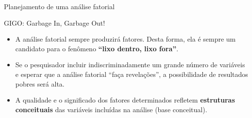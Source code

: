 \documentclass[
  ignorenonframetext,
  aspectratio=169,
]{beamer}
\providecommand{\tightlist}{%
  \setlength{\itemsep}{0pt}\setlength{\parskip}{0pt}}
\begin{document}
\begin{frame}{Planejamento de uma análise fatorial}
\label{planejamento-de-uma-anuxe1lise-fatorial-1}
\begin{block}{GIGO: Garbage In, Garbage Out!}
\label{gigo-garbage-in-garbage-out}
\begin{tcolorbox}[enhanced jigsaw, opacityback=0, left=2mm, colbacktitle=quarto-callout-warning-color!10!white, rightrule=.15mm, leftrule=.75mm, coltitle=black, toptitle=1mm, titlerule=0mm, toprule=.15mm, breakable, title=\textcolor{quarto-callout-warning-color}{\faExclamationTriangle}\hspace{0.5em}{Cuidado!}, colback=white, arc=.35mm, opacitybacktitle=0.6, bottomtitle=1mm, colframe=quarto-callout-warning-color-frame, bottomrule=.15mm]

\begin{itemize}
\tightlist
\item
  A análise fatorial sempre produzirá fatores. Desta forma, ela é sempre
  um candidato para o fenômeno \textbf{``lixo dentro, lixo fora''}.
\end{itemize}

\medskip

\begin{itemize}
\tightlist
\item
  Se o pesquisador incluir indiscriminadamente um grande número de
  variáveis e esperar que a análise fatorial ``faça revelações'', a
  possibilidade de resultados pobres será alta.
\end{itemize}

\medskip

\begin{itemize}
\tightlist
\item
  A qualidade e o significado dos fatores determinados refletem
  \textbf{estruturas conceituais} das variáveis incluídas na análise
  (base conceitual).
\end{itemize}

\end{tcolorbox}
\end{block}
\end{frame}
\end{document}
